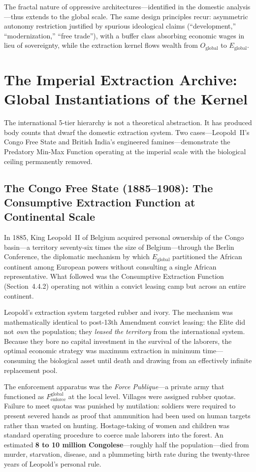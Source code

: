 \documentclass[12pt,openany]{book}
\begin{document}
The fractal nature of oppressive architectures---identified in the domestic analysis---thus extends to the global scale. The same design principles recur: asymmetric autonomy restriction justified by spurious ideological claims (``development,'' ``modernization,'' ``free trade''), with a buffer class absorbing economic wages in lieu of sovereignty, while the extraction kernel flows wealth from $O_{\text{global}}$ to $E_{\text{global}}$.

\section{The Imperial Extraction Archive: Global Instantiations of the Kernel}

The international 5-tier hierarchy is not a theoretical abstraction. It has produced body counts that dwarf the domestic extraction system. Two cases---Leopold~II's Congo Free State and British India's engineered famines---demonstrate the Predatory Min-Max Function operating at the imperial scale with the biological ceiling permanently removed.

\subsection{The Congo Free State (1885--1908): The Consumptive Extraction Function at Continental Scale}

In 1885, King Leopold~II of Belgium acquired personal ownership of the Congo basin---a territory seventy-six times the size of Belgium---through the Berlin Conference, the diplomatic mechanism by which $E_{\text{global}}$ partitioned the African continent among European powers without consulting a single African representative. What followed was the Consumptive Extraction Function (Section~4.4.2) operating not within a convict leasing camp but across an entire continent.

Leopold's extraction system targeted rubber and ivory. The mechanism was mathematically identical to post-13th Amendment convict leasing: the Elite did not \textit{own} the population; they \textit{leased the territory} from the international system. Because they bore no capital investment in the survival of the laborers, the optimal economic strategy was maximum extraction in minimum time---consuming the biological asset until death and drawing from an effectively infinite replacement pool.

The enforcement apparatus was the \textit{Force Publique}---a private army that functioned as $F_{\text{enforce}}^{\text{global}}$ at the local level. Villages were assigned rubber quotas. Failure to meet quotas was punished by mutilation: soldiers were required to present severed hands as proof that ammunition had been used on human targets rather than wasted on hunting. Hostage-taking of women and children was standard operating procedure to coerce male laborers into the forest. An estimated \textbf{8 to 10 million Congolese}---roughly half the population---died from murder, starvation, disease, and a plummeting birth rate during the twenty-three years of Leopold's personal rule.
\end{document}
